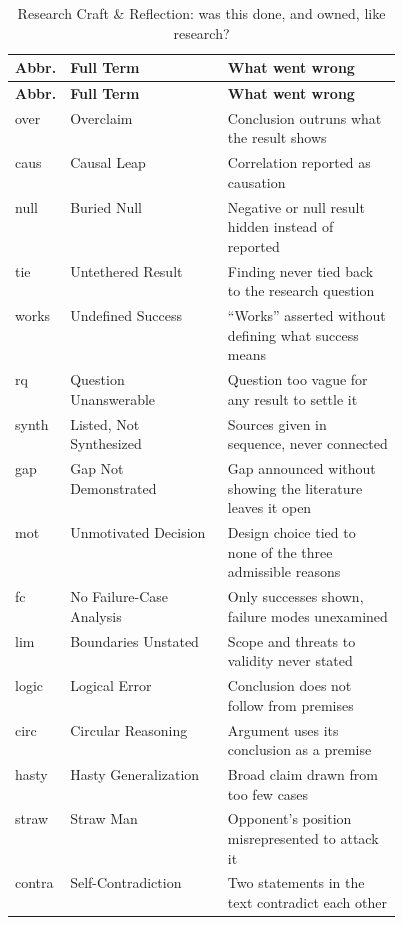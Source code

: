 \documentclass{../sharedAssets/tufte}
\begin{document}
\begin{longtable}{@{\extracolsep{\fill}}llp{0.45\linewidth}}
  \caption{Research Craft \& Reflection: was this done, and owned, like research?}\\
  \toprule
  \textbf{Abbr.} & \textbf{Full Term} & \textbf{What went wrong} \\
  \midrule
  \endfirsthead
  \toprule
  \textbf{Abbr.} & \textbf{Full Term} & \textbf{What went wrong} \\
  \midrule
  \endhead
  \bottomrule
  \endlastfoot
  over   & Overclaim                & Conclusion outruns what the result shows \\
  caus   & Causal Leap              & Correlation reported as causation \\
  null   & Buried Null              & Negative or null result hidden instead of reported \\
  tie    & Untethered Result        & Finding never tied back to the research question \\
  works  & Undefined Success        & ``Works'' asserted without defining what success means \\
  rq     & Question Unanswerable    & Question too vague for any result to settle it \\
  synth  & Listed, Not Synthesized  & Sources given in sequence, never connected \\
  gap    & Gap Not Demonstrated     & Gap announced without showing the literature leaves it open \\
  mot    & Unmotivated Decision     & Design choice tied to none of the three admissible reasons \\
  fc     & No Failure-Case Analysis & Only successes shown, failure modes unexamined \\
  lim    & Boundaries Unstated      & Scope and threats to validity never stated \\
  logic  & Logical Error            & Conclusion does not follow from premises \\
  circ   & Circular Reasoning       & Argument uses its conclusion as a premise \\
  hasty  & Hasty Generalization     & Broad claim drawn from too few cases \\
  straw  & Straw Man                & Opponent's position misrepresented to attack it \\
  contra & Self-Contradiction       & Two statements in the text contradict each other \\
\end{longtable}
\end{document}
